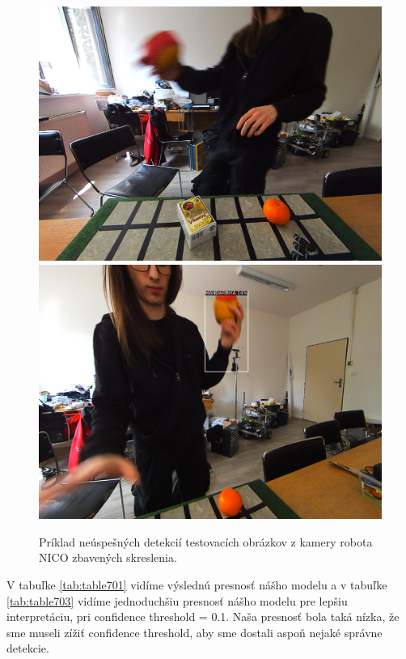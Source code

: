 \begin{figure}[H]
\includegraphics[width=\textwidth]{images/detections_screenshot_clean_wrong1.png}
\includegraphics[width=\textwidth]{images/detections_screenshot_clean_wrong2.png}
\centering
\caption{Príklad neúspešných detekcií testovacích obrázkov z kamery robota NICO zbavených skreslenia.}
\label{fig:image705}
\end{figure}

V tabuľke \ref{tab:table701} vidíme výslednú presnosť nášho modelu a v tabuľke \ref{tab:table703} vidíme jednoduchšiu presnosť nášho modelu pre lepšiu interpretáciu, pri confidence threshold = 0.1. Naša presnosť bola taká nízka, že sme museli zížiť confidence threshold, aby sme dostali aspoň nejaké správne detekcie.

